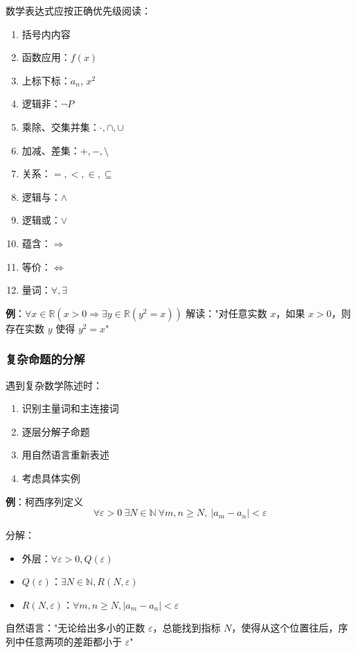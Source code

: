 \documentclass[12pt,a4paper,UTF8]{ctexart}
\begin{document}
数学表达式应按正确优先级阅读：
\begin{enumerate}
    \item 括号内内容
    \item 函数应用：$f(x)$
    \item 上标下标：$a_n$, $x^2$
    \item 逻辑非：$\neg P$
    \item 乘除、交集并集：$\cdot, \cap, \cup$
    \item 加减、差集：$+, -, \setminus$
    \item 关系：$=, <, \in, \subseteq$
    \item 逻辑与：$\land$
    \item 逻辑或：$\lor$
    \item 蕴含：$\Rightarrow$
    \item 等价：$\Leftrightarrow$
    \item 量词：$\forall, \exists$
\end{enumerate}

\textbf{例}：$\forall x \in \mathbb{R} (x > 0 \Rightarrow \exists y \in \mathbb{R} (y^2 = x))$
解读："对任意实数 $x$，如果 $x>0$，则存在实数 $y$ 使得 $y^2 = x$"

\subsubsection{复杂命题的分解}

遇到复杂数学陈述时：
\begin{enumerate}
    \item 识别主量词和主连接词
    \item 逐层分解子命题
    \item 用自然语言重新表述
    \item 考虑具体实例
\end{enumerate}

\textbf{例}：柯西序列定义
$$\forall \varepsilon > 0\ \exists N \in \mathbb{N}\ \forall m,n \ge N,\ |a_m - a_n| < \varepsilon$$

分解：
\begin{itemize}
    \item 外层：$\forall \varepsilon > 0, Q(\varepsilon)$
    \item $Q(\varepsilon)$：$\exists N \in \mathbb{N}, R(N,\varepsilon)$
    \item $R(N,\varepsilon)$：$\forall m,n \ge N, |a_m - a_n| < \varepsilon$
\end{itemize}

自然语言："无论给出多小的正数 $\varepsilon$，总能找到指标 $N$，使得从这个位置往后，序列中任意两项的差距都小于 $\varepsilon$"
\end{document}
